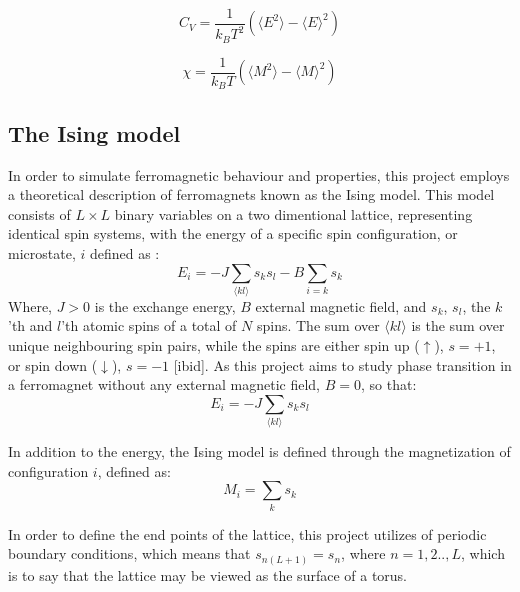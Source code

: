 \documentclass[%
oneside,                 %
final,                   %
10pt]{article}
\begin{document}
\begin{equation}
C_V=\frac{1}{k_B T^2} (\langle E^2 \rangle - \langle E \rangle^2 )
\label{eq:specificheat}
\end{equation}

\begin{equation}
\chi=\frac{1}{k_B T}(\langle M^2 \rangle - \langle M \rangle^2 )
\label{eq:Magsuscept}
\end{equation}	

\subsection{The Ising model}   
\label{SS:Ising}	
In order to simulate ferromagnetic behaviour and properties, this project employs a theoretical description of ferromagnets known as the Ising model. This model consists of $L \times L$ binary variables on a two dimentional lattice, representing identical spin systems, with the energy of a specific spin configuration, or microstate, $i$ defined as \cite{Fitzpatrick}:
\begin{equation}
E_i=-J\sum_{\langle kl \rangle} s_k s_l -B \sum_{i=k} s_k
\end{equation} 
Where, $J>0$ is the exchange energy, $B$ external magnetic field, and $s_k$, $s_l$, the $k$'th and $l$'th atomic spins of a total of $N$ spins. The sum over ${\langle kl \rangle}$ is the sum over unique neighbouring spin pairs, while the spins are either spin up ($\uparrow $), $s=+1$, or spin down ($\downarrow $), $s=-1$ [ibid].  As this project aims to study phase transition in a ferromagnet without any external magnetic field, $B=0$, so that:
\begin{equation}
E_i=-J\sum_{\langle kl \rangle} s_k s_l 
\label{eq:IsingEnergy}
\end{equation} 

In addition to the energy, the Ising model is defined through the magnetization of configuration $i$, defined as:
\begin{equation}
M_i=\sum_{k} s_k  
\end{equation}

In order to define the end points of the lattice, this project utilizes of periodic boundary conditions, which means that $s_{n(L+1)}=s_{n}$, where $n=1,2..,L$, which is to say that the lattice may be viewed as the surface of a torus.  
\end{document}
